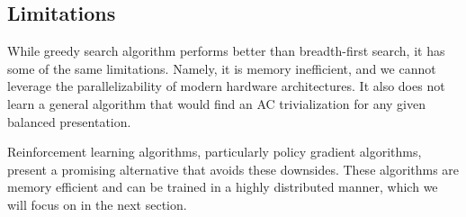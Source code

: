 \subsection{Limitations}

While greedy search algorithm performs better than breadth-first search, it has some of the same limitations.
Namely, it is memory inefficient, and we cannot leverage the parallelizability of modern hardware architectures.
It also does not learn a general algorithm that would find an AC trivialization for any given balanced presentation.

Reinforcement learning algorithms, particularly policy gradient algorithms, present a promising alternative that avoids these downsides.
These algorithms are memory efficient and can be trained in a highly distributed manner, which we will focus on in the next section.